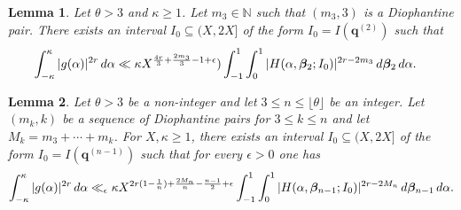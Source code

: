 \documentclass[10pt,a4paper]{amsart}
\newtheorem{lemma}{Lemma}
\renewcommand{\d}{\,{\rm d}}
\begin{document}
\begin{lemma} \label{lem:meancase2}
Let $\theta> 3$ and $\kappa \geq 1$. Let $m_3 \in \mathbb{N}$ such that $(m_3,3)$ is a Diophantine pair. There exists an interval $I_0 \subseteq (X,2X]$ of the form $I_0 = I(\mathbf{q}^{(2)}) $ such that 
\begin{align*} \int_{-\kappa}^{\kappa} |g(\alpha)|^{2r} \d\alpha 
& \ll \kappa X^{\frac{4r}{3}+\frac{2m_3}{3}-1+\epsilon})\int_{-1}^{1} \int_0^1 |H(\alpha,\boldsymbol{\beta}_2;I_0)|^{2r-2m_3} \d \boldsymbol{\beta}_2 \d \alpha.  
\end{align*}
\end{lemma} 

\begin{lemma} \label{lem:meancasegen}
Let $\theta > 3$ be a non-integer and let $3 \leq n \leq \lfloor \theta \rfloor$ be an integer. Let $(m_k,k)$ be a sequence of Diophantine pairs for $3 \leq k \leq n$ and let $M_k = m_3+\cdots+m_k$. For $X, \kappa \geq 1$, there exists an interval $I_0 \subseteq (X,2X]$ of the form $I_0 = I(\mathbf{q}^{(n-1)})$ such that for every $\epsilon > 0$ one has 
\[ \int_{-\kappa}^{\kappa} |g(\alpha)|^{2r} \d\alpha \ll_{\epsilon} \kappa X^{2r(1-\frac{1}{n})+\frac{2M_n}{n}-\frac{n-1}{2}+\epsilon} \int_{-1}^{1} \int_{0}^{1} |H(\alpha,\boldsymbol{\beta}_{n-1};I_0 )|^{2r-2M_n} \d \boldsymbol{\beta}_{n-1} \d \alpha. \]
\end{lemma}
\end{document}
